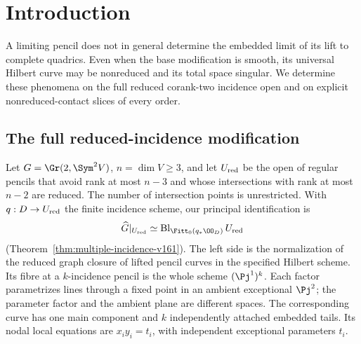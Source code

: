 \begin{abstract}
We identify the normalized Hilbert graph of lifted quadratic pencils
on the full reduced corank-two incidence open with a Fitting-ideal
blow-up. At a pencil with $k$ incidence points its entire fibre is
$(\mathbf P^1)^k$, and the universal curve is a reduced nodal tree.
Independence of the incidence centres follows from the radicals of
distinct pencil members, without an extra genericity hypothesis.
For symmetric Jordan slices of every contact order $m\geq2$, we
compute the normalized Hilbert modification and its nonreduced
curves: a main component meets an $m$-fold tail along a length-$m$
scheme. The total multiplication graph has transverse singularity
$A_{m-1}$. After ramified base change its normalization gives a
stable-map tail of degree $m$, distinguishing the Hilbert and stable
limits with the same cycle. The proofs use an exact power-ideal
identity over arbitrary complex algebras. All-rank power graphs,
singular-pencil data, and the complete earlier collision and
reciprocal-fibre results are included in the appendices.
\end{abstract}
\maketitle
\section{Introduction}
\label{sec:paper-ii-v161}
A limiting pencil does not in general determine the embedded limit
of its lift to complete quadrics. Even when the base modification
is smooth, its universal Hilbert curve may be nonreduced and its
total space singular. We determine these phenomena on the full
reduced corank-two incidence open and on explicit nonreduced-contact
slices of every order.

\subsection{The full reduced-incidence modification}
Let $G=\Gr(2,\Sym^2V)$, $n=\dim V\geq3$, and let $U_{\rm red}$
be the open of regular pencils that avoid rank at most $n-3$ and
whose intersections with rank at most $n-2$ are reduced. The number
of intersection points is unrestricted. With $q:D\to U_{\rm red}$
the finite incidence scheme, our principal identification is
\[
 \widehat G|_{U_{\rm red}}
       \simeq\operatorname{Bl}_{\Fitt_0(q_*\OO_D)}U_{\rm red}
\]
(Theorem~\ref{thm:multiple-incidence-v161}). The left side is the
normalization of the reduced graph closure of lifted pencil curves
in the specified Hilbert scheme. Its fibre at a $k$-incidence pencil
is the whole scheme $(\Pj^1)^k$. Each factor parametrizes lines
through a fixed point in an ambient exceptional $\Pj^2$; the
parameter factor and the ambient plane are different spaces.
The corresponding curve has one main component and $k$ independently
attached embedded tails. Its nodal local equations are
$x_i y_i=t_i$, with independent exceptional parameters $t_i$.

